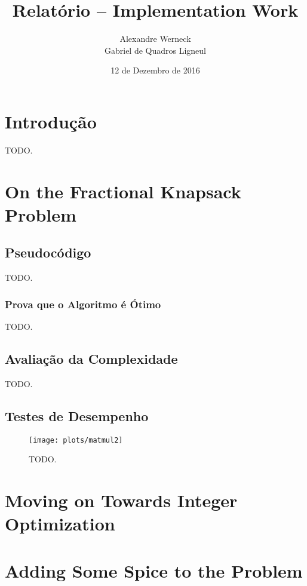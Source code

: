 \documentclass[a4paper, 11pt]{article}
\title{Relatório -- Implementation Work}
\author{Alexandre Werneck\\Gabriel de Quadros Ligneul}
\date{12 de Dezembro de 2016}
\begin{document}
\maketitle

\section{Introdução}

TODO.

\section{On the Fractional Knapsack Problem}

\subsection{Pseudocódigo}

TODO.

\subsubsection{Prova que o Algoritmo é Ótimo}

TODO.

\subsection{Avaliação da Complexidade}

TODO.

\subsection{Testes de Desempenho}

\begin{figure}[H]
  \centering
  \texttt{[image: plots/matmul2]}
  \caption{TODO.}
  \label{fig:matmul2}
\end{figure}

\section{Moving on Towards Integer Optimization}

\section{Adding Some Spice to the Problem}
\end{document}
